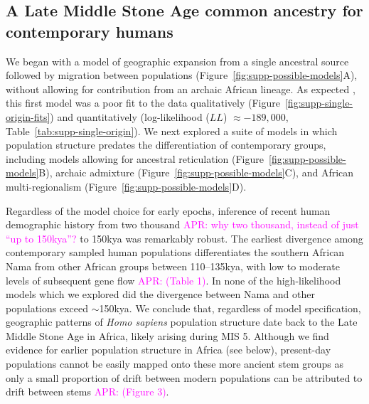 \documentclass[]{article}
\newcommand{\aprcomment}[1]{{\textcolor{magenta}{APR: #1}}}
\begin{document}
\subsection*{A Late Middle Stone Age common ancestry for contemporary humans}

We began with a model of geographic expansion from a single ancestral source
followed by migration between populations
(Figure~\ref{fig:supp-possible-models}A), without allowing for contribution
from an archaic African lineage. As expected \citep{Ragsdale2019-nt}, this
first model was a poor fit to the data qualitatively
(Figure~\ref{fig:supp-single-origin-fits}) and quantitatively (log-likelihood
($LL$) $\approx -189,000$, Table~\ref{tab:supp-single-origin}). We next explored a
suite of models in which population structure predates the differentiation of
contemporary groups, including models allowing for ancestral reticulation
(Figure~\ref{fig:supp-possible-models}B), archaic admixture
(Figure~\ref{fig:supp-possible-models}C), and African multi-regionalism
(Figure~\ref{fig:supp-possible-models}D).

Regardless of the model choice for early epochs, inference of recent human
demographic history from two thousand \aprcomment{why two thousand, instead of
just ``up to 150kya''?} to 150kya was remarkably robust. The earliest divergence
among contemporary sampled human populations differentiates the southern
African Nama from other African groups between 110--135kya, with low to moderate
levels of subsequent gene flow \aprcomment{(Table 1)}. In none of the
high-likelihood models which we explored did the divergence between Nama and
other populations exceed $\sim$150kya. We conclude that, regardless of model
specification, geographic patterns of \emph{Homo sapiens} population structure
date back to the Late Middle Stone Age in Africa, likely arising during MIS 5.
Although we find evidence for earlier population structure in Africa (see
below), present-day populations cannot be easily mapped onto these more ancient
stem groups as only a small proportion of drift between modern populations can
be attributed to drift between stems \aprcomment{(Figure 3)}. 
\end{document}

